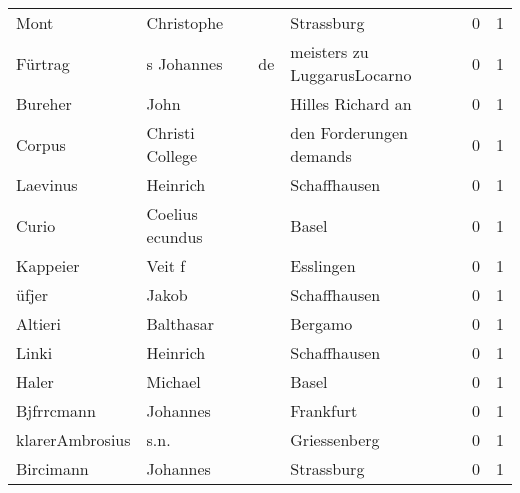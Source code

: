 \begin{center}
\begin{tiny}
\begin{longtabu}{llllrr}
                     Mont &                         Christophe &             &                                  Strassburg &          0 &         1 \\
                  Fürtrag &                         s Johannes &          de &                 meisters zu LuggarusLocarno &          0 &         1 \\
                  Bureher &                               John &             &                           Hilles Richard an &          0 &         1 \\
                   Corpus &                    Christi College &             &                     den Forderungen demands &          0 &         1 \\
                 Laevinus &                           Heinrich &             &                                Schaffhausen &          0 &         1 \\
                    Curio &                    Coelius ecundus &             &                                       Basel &          0 &         1 \\
                 Kappeier &                             Veit f &             &                                   Esslingen &          0 &         1 \\
                    üfjer &                              Jakob &             &                                Schaffhausen &          0 &         1 \\
                  Altieri &                          Balthasar &             &                                     Bergamo &          0 &         1 \\
                    Linki &                           Heinrich &             &                                Schaffhausen &          0 &         1 \\
                    Haler &                            Michael &             &                                       Basel &          0 &         1 \\
               Bjfrrcmann &                           Johannes &             &                                   Frankfurt &          0 &         1 \\
          klarerAmbrosius &                               s.n. &             &                                Griessenberg &          0 &         1 \\
                Bircimann &                           Johannes &             &                                  Strassburg &          0 &         1 \\

\end{longtabu}
\end{tiny}
\end{center}
